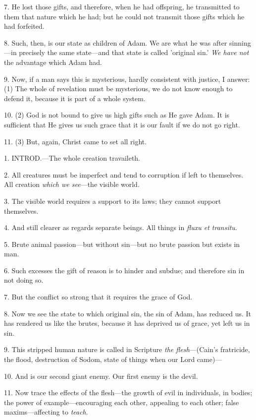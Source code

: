 7. He lost those gifts, and therefore, when he
had offspring, he transmitted to them that nature which he had; but he
could not transmit those gifts which he had forfeited.

8. Such, then, is our state as children of Adam.
We are what he was after sinning—in precisely the same state—and
that state is called 'original sin.' \emph{We have not} the advantage
which Adam had.

9. Now, if a man says this is mysterious, hardly
consistent with justice, I answer: (1) The whole of revelation must be
mysterious, we do not know enough to defend it, because it is part of
a whole system.

10. (2) God is not bound to give us high gifts
such as He gave Adam. It is sufficient that He gives us such grace
that it is our fault if we do not go right.

11. (3) But, again, Christ came to set all right.


1. INTROD.—The
whole creation travaileth.

2. All creatures must be imperfect and tend to
corruption if left to themselves. All creation \emph{which we see}—the
visible world.

3. The visible world requires a support to its
laws; they cannot support themselves.

4. And still clearer as regards separate beings.
All things in \emph{fluxu et transitu}.

5. Brute animal passion—but without sin—but
no brute passion but exists in man.

6. Such excesses the gift of reason is to hinder
and subdue; and therefore sin in not doing so.

7. But the conflict so strong that it requires
the grace of God.

8. Now we see the state to which original sin,
the sin of Adam, has reduced us. It has rendered us like the brutes,
because it has deprived us of grace, yet left us in sin.

9. This stripped human nature is called in
Scripture \emph{the flesh}—(Cain's fratricide, the flood,
destruction of Sodom, state of things when our Lord came)—

10. And is our second giant enemy. Our first
enemy is the devil.

11. Now trace the effects of the flesh—the
growth of evil in individuals, in bodies; the power of
example—encouraging each other, appealing to each other; false
maxims—affecting to \emph{teach}.

